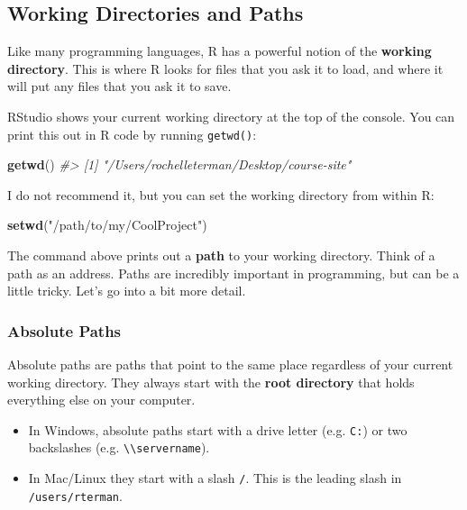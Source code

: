 \documentclass[]{book}
\newenvironment{Shaded}{\begin{snugshade}}{\end{snugshade}}
\newcommand{\KeywordTok}[1]{\textcolor[rgb]{0.13,0.29,0.53}{\textbf{#1}}}
\newcommand{\StringTok}[1]{\textcolor[rgb]{0.31,0.60,0.02}{#1}}
\newcommand{\CommentTok}[1]{\textcolor[rgb]{0.56,0.35,0.01}{\textit{#1}}}
\newcommand{\NormalTok}[1]{#1}
\providecommand{\tightlist}{%
  \setlength{\itemsep}{0pt}\setlength{\parskip}{0pt}}
\begin{document}
\subsection{Working Directories and
Paths}\label{working-directories-and-paths}

Like many programming languages, R has a powerful notion of the
\textbf{working directory}. This is where R looks for files that you ask
it to load, and where it will put any files that you ask it to save.

RStudio shows your current working directory at the top of the console.
You can print this out in R code by running \texttt{getwd()}:

\begin{Shaded}
\begin{Highlighting}[]
\KeywordTok{getwd}\NormalTok{()}
\CommentTok{#> [1] "/Users/rochelleterman/Desktop/course-site"}
\end{Highlighting}
\end{Shaded}

I do not recommend it, but you can set the working directory from within
R:

\begin{Shaded}
\begin{Highlighting}[]
\KeywordTok{setwd}\NormalTok{(}\StringTok{"/path/to/my/CoolProject"}\NormalTok{)}
\end{Highlighting}
\end{Shaded}

The command above prints out a \textbf{path} to your working directory.
Think of a path as an address. Paths are incredibly important in
programming, but can be a little tricky. Let's go into a bit more
detail.

\subsubsection*{Absolute Paths}\label{absolute-paths}

Absolute paths are paths that point to the same place regardless of your
current working directory. They always start with the \textbf{root
directory} that holds everything else on your computer.

\begin{itemize}
\tightlist
\item
  In Windows, absolute paths start with a drive letter (e.g.
  \texttt{C:}) or two backslashes (e.g.
  \texttt{\textbackslash{}\textbackslash{}servername}).
\item
  In Mac/Linux they start with a slash \texttt{/}. This is the leading
  slash in \texttt{/users/rterman}.
\end{itemize}
\end{document}
